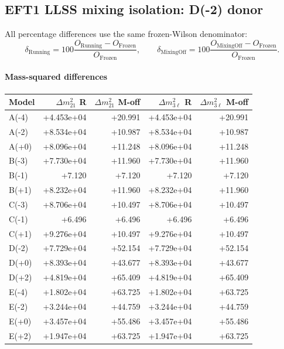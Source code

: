 \subsection*{EFT1 LLSS mixing isolation: D(-2) donor}
All percentage differences use the same frozen-Wilson denominator:
\[\delta_{\mathrm{Running}}=100\frac{O_{\mathrm{Running}}-O_{\mathrm{Frozen}}}{O_{\mathrm{Frozen}}},\qquad\delta_{\mathrm{MixingOff}}=100\frac{O_{\mathrm{MixingOff}}-O_{\mathrm{Frozen}}}{O_{\mathrm{Frozen}}}.\]
\paragraph{Mass-squared differences}
\begin{center}
\begin{tabular}{lrrrr}
\hline
Model & $\Delta m^2_{21}$ R & $\Delta m^2_{21}$ M-off & $\Delta m^2_{3\ell}$ R & $\Delta m^2_{3\ell}$ M-off \\
\hline
A(-4) & +4.453e+04 & +20.991 & +4.453e+04 & +20.991 \\
A(-2) & +8.534e+04 & +10.987 & +8.534e+04 & +10.987 \\
A(+0) & +8.096e+04 & +11.248 & +8.096e+04 & +11.248 \\
B(-3) & +7.730e+04 & +11.960 & +7.730e+04 & +11.960 \\
B(-1) & +7.120 & +7.120 & +7.120 & +7.120 \\
B(+1) & +8.232e+04 & +11.960 & +8.232e+04 & +11.960 \\
C(-3) & +8.706e+04 & +10.497 & +8.706e+04 & +10.497 \\
C(-1) & +6.496 & +6.496 & +6.496 & +6.496 \\
C(+1) & +9.276e+04 & +10.497 & +9.276e+04 & +10.497 \\
D(-2) & +7.729e+04 & +52.154 & +7.729e+04 & +52.154 \\
D(+0) & +8.393e+04 & +43.677 & +8.393e+04 & +43.677 \\
D(+2) & +4.819e+04 & +65.409 & +4.819e+04 & +65.409 \\
E(-4) & +1.802e+04 & +63.725 & +1.802e+04 & +63.725 \\
E(-2) & +3.244e+04 & +44.759 & +3.244e+04 & +44.759 \\
E(+0) & +3.457e+04 & +55.486 & +3.457e+04 & +55.486 \\
E(+2) & +1.947e+04 & +63.725 & +1.947e+04 & +63.725 \\
\hline
\end{tabular}
\end{center}
